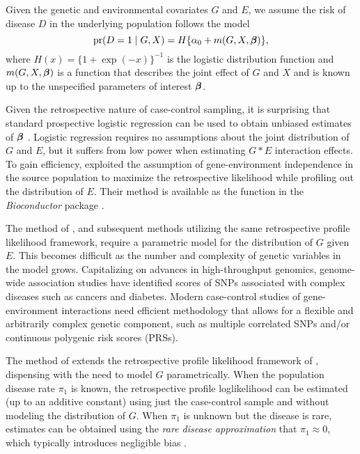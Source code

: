 \documentclass[nojss]{jss}
\begin{document}
Given the genetic and environmental covariates \(G\) and \(E\), we
assume the risk of disease \(D\) in the underlying population follows
the model \[ \hbox{pr}(D=1 \mid G,X) = H\{\alpha_0 + m(G,X,\mbox{\boldmath $\beta$})\}, \] where
\(H(x)=\{ 1 + \exp(-x)\}^{-1}\) is the logistic distribution function
and \(m(G,X,\mbox{\boldmath $\beta$})\) is a function that describes the joint effect of
\(G\) and \(X\) and is known up to the unspecified parameters of
interest \(\mbox{\boldmath $\beta$}\).

Given the retrospective nature of case-control sampling, it is
surprising that standard prospective logistic regression can be used to
obtain unbiased estimates of \(\mbox{\boldmath $\beta$}\) \citep{PrenticePyke1979}.
Logistic regression requires no assumptions about the joint distribution
of \(G\) and \(E\), but it suffers from low power when estimating
\(G * E\) interaction effects. To gain efficiency,
\citet{ChatterjeeCarroll2005} exploited the assumption of
gene-environment independence in the source population to maximize the
retrospective likelihood while profiling out the distribution of \(E\).
Their method is available as the function  in the
\emph{Bioconductor} package  \citep{CGEN2012}.

The method of \citeauthor{ChatterjeeCarroll2005}, and subsequent methods
utilizing the same retrospective profile likelihood framework, require a
parametric model for the distribution of \(G\) given \(E\). This becomes
difficult as the number and complexity of genetic variables in the model
grows. Capitalizing on advances in high-throughput genomics, genome-wide
association studies have identified scores of SNPs associated with
complex diseases such as cancers and diabetes. Modern case-control
studies of gene-environment interactions need efficient methodology that
allows for a flexible and arbitrarily complex genetic component, such as
multiple correlated SNPs and/or continuous polygenic risk scores (PRSs).

The method of \citet{Stalder2017} extends the retrospective profile
likelihood framework of \citeauthor{ChatterjeeCarroll2005}, dispensing
with the need to model \(G\) parametrically. When the population disease
rate \(\pi_1\) is known, the retrospective profile loglikelihood can be
estimated (up to an additive constant) using just the case-control
sample and without modeling the distribution of \(G\). When \(\pi_1\) is
unknown but the disease is rare, estimates can be obtained using the
\emph{rare disease approximation} that \(\pi_1 \approx 0\), which
typically introduces negligible bias \citep{Stalder2017}.
\end{document}
